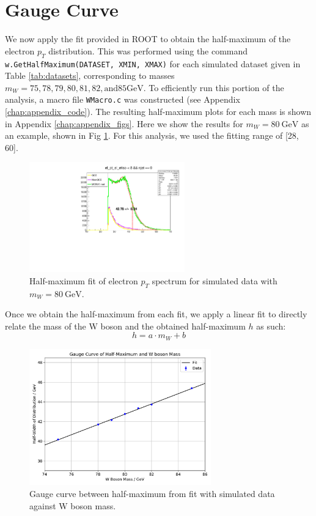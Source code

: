 \documentclass[a4paper]{report}
\numberwithin{equation}{section}
\begin{document}
\section{Gauge Curve}

We now apply the fit provided in ROOT to obtain the half-maximum of the electron $p_T$ distribution. This was performed using the 
command \texttt{w.GetHalfMaximum(DATASET, XMIN, XMAX)} for each simulated dataset given in Table \ref{tab:datasets}, 
corresponding to masses $m_W = 75, 78, 79, 80, 81, 82, \mathrm{ and } 85 \si{\giga\electronvolt}$. To efficiently run this portion 
of the analysis, a macro file \texttt{WMacro.c} was constructed (see Appendix \ref{chap:appendix_code}). The resulting half-maximum plots 
for each mass is shown in Appendix \ref{chap:appendix_figs}. Here we show the results for $m_W = \SI{80}{\giga\electronvolt}$ as 
an example, shown in Fig \ref{fig:hm_m80}. For this analysis, we used the fitting range of [28, 60].

\begin{figure}[htpb]
    \centering
    \includegraphics[width=0.6\textwidth]{hm_80.pdf}
    \caption{Half-maximum fit of electron $p_T$ spectrum for simulated data with $m_W = \SI{80}{\giga\electronvolt}$.}
    \label{fig:hm_m80}
\end{figure}

Once we obtain the half-maximum from each fit, we apply a linear fit to directly relate the mass of the W boson and the 
obtained half-maximum $h$ as such: 
\begin{equation}
    h = a \cdot m_W + b
    \label{eq:half_max}
\end{equation}

\begin{figure}[htpb]
    \centering
    \includegraphics[width=0.7\textwidth]{gauge_curve.pdf}
    \caption{Gauge curve between half-maximum from fit with simulated data against W boson mass.}
    \label{fig:gauge_curve}
\end{figure}
\end{document}
